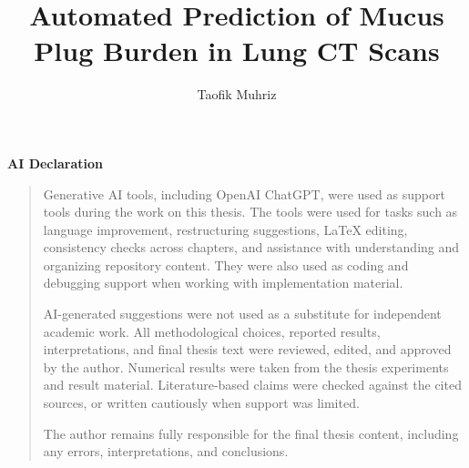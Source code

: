 \documentclass[a4paper,book,masters,en,listoffigures,listoftables]{NMBU}
\title{Automated Prediction of Mucus Plug Burden in Lung CT Scans}
\author{Taofik Muhriz}
\begin{document}
\startthesis
\pagestyle{plain}










\clearpage
\thispagestyle{plain}
\begin{center}
\noindent\normalfont\LARGE\textbf{AI Declaration}
\end{center}
\begin{quotation}
\sloppy
Generative AI tools, including OpenAI ChatGPT, were used as support tools during the work on this thesis. The tools were used for tasks such as language improvement, restructuring suggestions, LaTeX editing, consistency checks across chapters, and assistance with understanding and organizing repository content. They were also used as coding and debugging support when working with implementation material.

AI-generated suggestions were not used as a substitute for independent academic work. All methodological choices, reported results, interpretations, and final thesis text were reviewed, edited, and approved by the author. Numerical results were taken from the thesis experiments and result material. Literature-based claims were checked against the cited sources, or written cautiously when support was limited.

The author remains fully responsible for the final thesis content, including any errors, interpretations, and conclusions.
\end{quotation}


\end{document}
